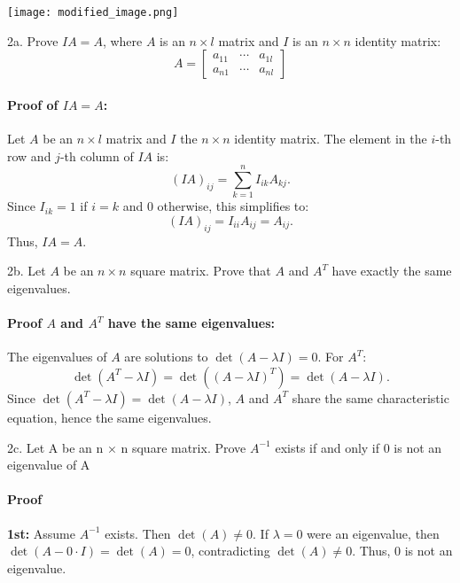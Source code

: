 \documentclass[12pt,letterpaper]{article}
\begin{document}
\begin{center}
   \texttt{[image: modified\_image.png]}
\end{center}

    \newpage

    2a. Prove \( IA = A \), where \( A \) is an \( n \times l \) matrix and \( I \) is an \( n \times n \) identity matrix:
    \[
        A = \begin{bmatrix}
            a_{11} & \cdots & a_{1l} \\
            a_{n1} & \cdots & a_{nl}
        \end{bmatrix}
    \]
    \paragraph{Proof of \( IA = A \):}
    Let \( A \) be an \( n \times l \) matrix and \( I \) the \( n \times n \) identity matrix. 
    The element in the \( i \)-th row and \( j \)-th column of \( IA \) is:
    \[
    (IA)_{ij} = \sum_{k=1}^{n} I_{ik} A_{kj}.
    \]
    Since \( I_{ik} = 1 \) if \( i = k \) and \( 0 \) otherwise, this simplifies to:
    \[
    (IA)_{ij} = I_{ii} A_{ij} = A_{ij}.
    \]
    Thus, \( IA = A \). \qedhere

    
    
    \vspace{1.2cm}

    2b. Let \( A \) be an \( n \times n \) square matrix. Prove that \( A \) and \( A^T \) have exactly the same eigenvalues.
    \paragraph{Proof \( A \) and \( A^T \) have the same eigenvalues:}
    The eigenvalues of \( A \) are solutions to \( \det(A - \lambda I) = 0 \). For \( A^T \):
    \[
    \det(A^T - \lambda I) = \det((A - \lambda I)^T) = \det(A - \lambda I).
    \]
    Since \( \det(A^T - \lambda I) = \det(A - \lambda I) \), \( A \) and \( A^T \) share the same characteristic equation, hence the same eigenvalues. \qedhere

    \vspace{1cm}
    2c. Let A be an n × n square matrix. Prove $A^{-1}$ exists if and only if 0 is not an eigenvalue of A

    \paragraph{Proof}  
    \textbf{1st:} Assume \( A^{-1} \) exists. Then \( \det(A) \neq 0 \).  
    If \( \lambda = 0 \) were an eigenvalue, then \( \det(A - 0 \cdot I) = \det(A) = 0 \), contradicting \( \det(A) \neq 0 \).  
    Thus, \( 0 \) is not an eigenvalue.  
    
\end{document}
